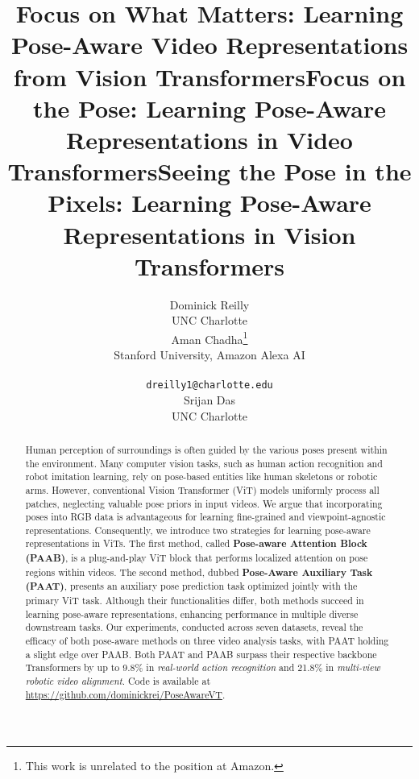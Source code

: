 \documentclass{article}
\title{Focus on What Matters: Learning Pose-Aware Video Representations from Vision Transformers}
\title{Focus on the Pose: Learning Pose-Aware Representations in Video Transformers}
\title{Seeing the Pose in the Pixels: Learning Pose-Aware Representations in Vision Transformers}
\author{
  Dominick Reilly\\ UNC Charlotte \\
\And
  Aman Chadha\thanks{This work is unrelated to the position at Amazon.} \\
  Stanford University, Amazon Alexa AI\\
\\
   \texttt{dreilly1@charlotte.edu} \\
  \And
 Srijan Das\\
  UNC Charlotte\\
}
\begin{document}
\maketitle



\begin{abstract}
Human perception of surroundings is often guided by the various poses present within the environment. Many computer vision tasks, such as human action recognition and robot imitation learning, rely on pose-based entities like human skeletons or robotic arms. However, conventional Vision Transformer (ViT) models uniformly process all patches, neglecting valuable pose priors in input videos. We argue that incorporating poses into RGB data is advantageous for learning fine-grained and viewpoint-agnostic representations. Consequently, we introduce two strategies for learning pose-aware representations in ViTs.
    The first method, called \textbf{Pose-aware Attention Block (PAAB)}, is a plug-and-play ViT block that performs localized attention on pose regions within videos. The second method, dubbed \textbf{Pose-Aware Auxiliary Task (PAAT)}, presents an auxiliary pose prediction task optimized jointly with the primary ViT task. 
    Although their functionalities differ, both methods succeed in learning pose-aware representations, enhancing performance in multiple diverse downstream tasks. Our experiments, conducted across seven datasets, reveal the efficacy of both pose-aware methods on three video analysis tasks, with PAAT holding a slight edge over PAAB. Both PAAT and PAAB surpass their respective backbone Transformers by up to 9.8\% in \textit{real-world action recognition} and 21.8\% in \textit{multi-view robotic video alignment}. Code is available at \url{https://github.com/dominickrei/PoseAwareVT}.
    




\end{abstract}

\vspace{-0.2in}
\end{document}
